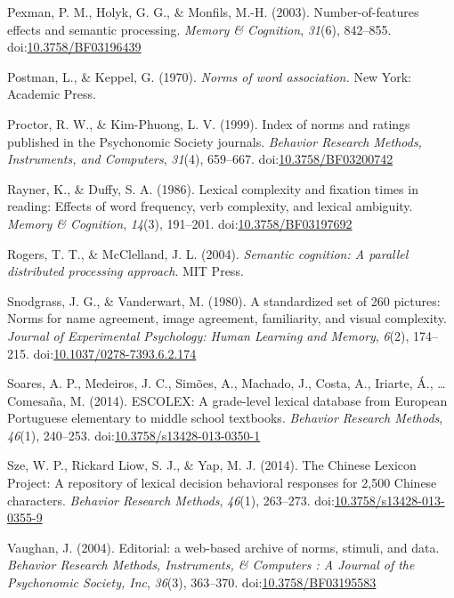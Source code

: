 \documentclass[english,man]{apa6}
\theoremstyle{definition}
\theoremstyle{definition}
\theoremstyle{definition}
\theoremstyle{remark}
\begin{document}
\hypertarget{ref-Pexman2003}{}
Pexman, P. M., Holyk, G. G., \& Monfils, M.-H. (2003).
Number-of-features effects and semantic processing. \emph{Memory \&
Cognition}, \emph{31}(6), 842--855.
doi:\href{https://doi.org/10.3758/BF03196439}{10.3758/BF03196439}

\hypertarget{ref-Postman1970}{}
Postman, L., \& Keppel, G. (1970). \emph{Norms of word association.} New
York: Academic Press.

\hypertarget{ref-Proctor1999}{}
Proctor, R. W., \& Kim-Phuong, L. V. (1999). Index of norms and ratings
published in the Psychonomic Society journals. \emph{Behavior Research
Methods, Instruments, and Computers}, \emph{31}(4), 659--667.
doi:\href{https://doi.org/10.3758/BF03200742}{10.3758/BF03200742}

\hypertarget{ref-Rayner1986}{}
Rayner, K., \& Duffy, S. A. (1986). Lexical complexity and fixation
times in reading: Effects of word frequency, verb complexity, and
lexical ambiguity. \emph{Memory \& Cognition}, \emph{14}(3), 191--201.
doi:\href{https://doi.org/10.3758/BF03197692}{10.3758/BF03197692}

\hypertarget{ref-Rogers2004}{}
Rogers, T. T., \& McClelland, J. L. (2004). \emph{Semantic cognition: A
parallel distributed processing approach}. MIT Press.

\hypertarget{ref-Snodgrass1980}{}
Snodgrass, J. G., \& Vanderwart, M. (1980). A standardized set of 260
pictures: Norms for name agreement, image agreement, familiarity, and
visual complexity. \emph{Journal of Experimental Psychology: Human
Learning and Memory}, \emph{6}(2), 174--215.
doi:\href{https://doi.org/10.1037/0278-7393.6.2.174}{10.1037/0278-7393.6.2.174}

\hypertarget{ref-Soares2014}{}
Soares, A. P., Medeiros, J. C., Simões, A., Machado, J., Costa, A.,
Iriarte, Á., \ldots{} Comesaña, M. (2014). ESCOLEX: A grade-level
lexical database from European Portuguese elementary to middle school
textbooks. \emph{Behavior Research Methods}, \emph{46}(1), 240--253.
doi:\href{https://doi.org/10.3758/s13428-013-0350-1}{10.3758/s13428-013-0350-1}

\hypertarget{ref-Sze2014}{}
Sze, W. P., Rickard Liow, S. J., \& Yap, M. J. (2014). The Chinese
Lexicon Project: A repository of lexical decision behavioral responses
for 2,500 Chinese characters. \emph{Behavior Research Methods},
\emph{46}(1), 263--273.
doi:\href{https://doi.org/10.3758/s13428-013-0355-9}{10.3758/s13428-013-0355-9}

\hypertarget{ref-Vaughan2004}{}
Vaughan, J. (2004). Editorial: a web-based archive of norms, stimuli,
and data. \emph{Behavior Research Methods, Instruments, \& Computers : A
Journal of the Psychonomic Society, Inc}, \emph{36}(3), 363--370.
doi:\href{https://doi.org/10.3758/BF03195583}{10.3758/BF03195583}
\end{document}

